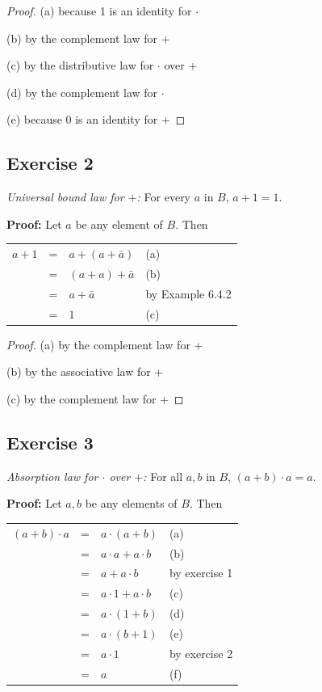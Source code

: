 \documentclass[14pt]{extarticle}
\newcommand{\fbl}{\underline{\hspace{1cm}}\,\,}
\newcommand{\cy}{\color{cyan}}
\begin{document}
\begin{proof}
{\cy (a)} because 1 is an identity for $\cdot$ 

{\cy (b)} by the complement law for + 

{\cy (c)} by the distributive law for $\cdot$ over +

{\cy (d)} by the complement law for $\cdot$ 

{\cy (e)} because 0 is an identity for +
\end{proof}

\subsection{Exercise 2}
{\it Universal bound law for $+$:} For every $a$ in $B$, \(a + 1 = 1\).

{\bf Proof:} Let $a$ be any element of $B$. Then

\begin{center}
\begin{tabular}{rcll}
\(a+1\) & = & \(a+(a+\bar{a})\) & {\cy (a) \fbl} \\
\(\) & = & \((a+a)+\bar{a}\) & {\cy (b) \fbl} \\
\(\) & = & \(a + \bar{a}\) & {\cy by Example 6.4.2} \\
\(\) & = & \(1\) & {\cy (c) \fbl}
\end{tabular}
\end{center}

\begin{proof}
{\cy (a)} by the complement law for + 

{\cy (b)} by the associative law for + 

{\cy (c)} by the complement law for +
\end{proof}

\subsection{Exercise 3}
{\it Absorption law for $\cdot$ over $+$:} For all $a, b$ in $B$, \((a + b) \cdot a = a\).

{\bf Proof:} Let $a, b$ be any elements of $B$. Then

\begin{center}
\begin{tabular}{rcll}
\((a+b) \cdot a\) & = & \(a \cdot (a+b)\) & {\cy(a)\fbl} \\
\(\) & = & \(a \cdot a + a \cdot b\) & {\cy (b) \fbl} \\
\(\) & = & \(a + a \cdot b\) & {\cy by exercise 1} \\
\(\) & = & \(a \cdot 1 + a \cdot b\) & {\cy (c) \fbl} \\
\(\) & = & \(a \cdot(1 + b)\) & {\cy (d) \fbl} \\
\(\) & = & \(a \cdot(b + 1)\) & {\cy (e) \fbl} \\
\(\) & = & \(a \cdot 1\) & {\cy by exercise 2} \\
\(\) & = & \(a\) & {\cy (f) \fbl}
\end{tabular}
\end{center}
\end{document}
